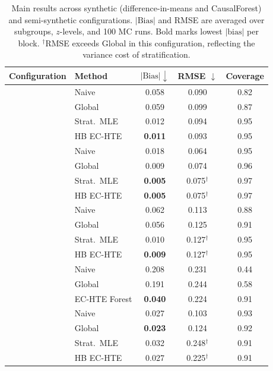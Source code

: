 \begin{table}[t]
\centering
\caption{Main results across synthetic (difference-in-means and CausalForest) and semi-synthetic configurations. $|\text{Bias}|$ and RMSE are averaged over subgroups, $z$-levels, and 100 MC runs. Bold marks lowest $|\text{bias}|$ per block. $^\dagger$RMSE exceeds Global in this configuration, reflecting the variance cost of stratification.}
\label{tab:main_results}
\small
\begin{tabular}{ll ccc}
\toprule
Configuration & Method & $|\text{Bias}| \downarrow$ & RMSE $\downarrow$ & Coverage \\
\midrule
{}
 & Naive & 0.058 & 0.090 & 0.82 \\
 & Global & 0.059 & 0.099 & 0.87 \\
 & Strat.\ MLE & 0.012 & 0.094 & 0.95 \\
 & HB EC-HTE & \textbf{0.011} & 0.093 & 0.95 \\
\midrule
{}
 & Naive & 0.018 & 0.064 & 0.95 \\
 & Global & 0.009 & 0.074 & 0.96 \\
 & Strat.\ MLE & \textbf{0.005} & 0.075$^\dagger$ & 0.97 \\
 & HB EC-HTE & \textbf{0.005} & 0.075$^\dagger$ & 0.97 \\
\midrule
{}
 & Naive & 0.062 & 0.113 & 0.88 \\
 & Global & 0.056 & 0.125 & 0.91 \\
 & Strat.\ MLE & 0.010 & 0.127$^\dagger$ & 0.95 \\
 & HB EC-HTE & \textbf{0.009} & 0.127$^\dagger$ & 0.95 \\
\midrule
{}
 & Naive & 0.208 & 0.231 & 0.44 \\
 & Global & 0.191 & 0.244 & 0.58 \\
 & EC-HTE Forest & \textbf{0.040} & 0.224 & 0.91 \\
\midrule
{}
 & Naive & 0.027 & 0.103 & 0.93 \\
 & Global & \textbf{0.023} & 0.124 & 0.92 \\
 & Strat.\ MLE & 0.032 & 0.248$^\dagger$ & 0.91 \\
 & HB EC-HTE & 0.027 & 0.225$^\dagger$ & 0.91 \\
\bottomrule
\end{tabular}
\end{table}

